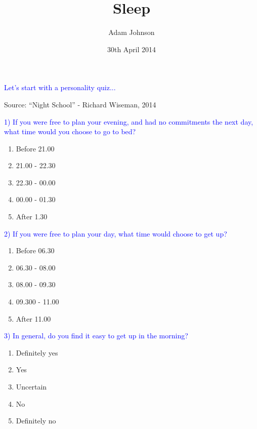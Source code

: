 \documentclass[landscape]{slides}
\title{Sleep}
\author{Adam Johnson}
\date{30th April 2014}
\begin{document}
\maketitle


\begin{slide}

    \textcolor{blue}{\Large{Let's start with a personality quiz...}}

    \small{Source: ``Night School'' - Richard Wiseman, 2014}

\end{slide}


\begin{slide}

    \textcolor{blue}{\Large{1) If you were free to plan your evening, and had no commitments the next day, what time would you choose to go to bed?}}

    \begin{enumerate}
        \item Before 21.00
        \item 21.00 - 22.30
        \item 22.30 - 00.00
        \item 00.00 - 01.30
        \item After 1.30
    \end{enumerate}

\end{slide}


\begin{slide}

    \textcolor{blue}{\Large{2) If you were free to plan your day, what time would choose to get up?}}

    \begin{enumerate}
        \item Before 06.30
        \item 06.30 - 08.00
        \item 08.00 - 09.30
        \item 09.300 - 11.00
        \item After 11.00
    \end{enumerate}

\end{slide}



\begin{slide}

    \textcolor{blue}{\Large{3) In general, do you find it easy to get up in the morning?}}

    \begin{enumerate}
        \item Definitely yes
        \item Yes
        \item Uncertain
        \item No
        \item Definitely no
    \end{enumerate}

\end{slide}
\end{document}
